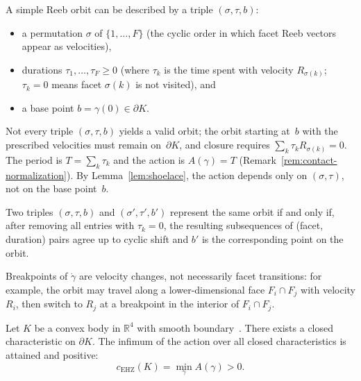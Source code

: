 \begin{remark}\label{rem:simple-orbit-data}
A simple Reeb orbit can be described by a triple $(\sigma, \tau, b)$:
\begin{itemize}
\item a permutation $\sigma$ of $\{1, \ldots, F\}$
  (the cyclic order in which facet Reeb vectors appear as velocities),
\item durations $\tau_1, \ldots, \tau_F \geq 0$
  (where $\tau_k$ is the time spent with velocity $R_{\sigma(k)}$;
  $\tau_k = 0$ means facet $\sigma(k)$ is not visited), and
\item a base point $b = \gamma(0) \in \partial K$.
\end{itemize}
Not every triple $(\sigma, \tau, b)$ yields a valid orbit;
the orbit starting at~$b$ with the prescribed velocities must
remain on~$\partial K$, and closure requires
$\sum_k \tau_k R_{\sigma(k)} = 0$.
The period is $T = \sum_k \tau_k$ and the action is $A(\gamma) = T$
(Remark~\ref{rem:contact-normalization}).
By Lemma~\ref{lem:shoelace}, the action depends only on
$(\sigma, \tau)$, not on the base point~$b$.

Two triples $(\sigma, \tau, b)$ and $(\sigma', \tau', b')$
represent the same orbit if and only if, after removing all entries
with $\tau_k = 0$, the resulting subsequences of (facet, duration)
pairs agree up to cyclic shift and $b'$ is the corresponding
point on the orbit.

Breakpoints of $\dot{\gamma}$ are velocity changes, not necessarily
facet transitions: for example, the orbit may travel along a
lower-dimensional face $F_i \cap F_j$ with velocity $R_i$, then
switch to $R_j$ at a breakpoint in the interior of $F_i \cap F_j$.
\end{remark}

\begin{theorem}\label{thm:orbit-existence-smooth}
Let $K$ be a convex body in $\mathbb{R}^4$ with smooth boundary~\cite{Rabinowitz1978}.
There exists a closed characteristic on $\partial K$.
The infimum of the action over all closed characteristics
is attained and positive:
\[
  c_{\mathrm{EHZ}}(K) = \min_{\gamma} A(\gamma) > 0.
\]
\end{theorem}

